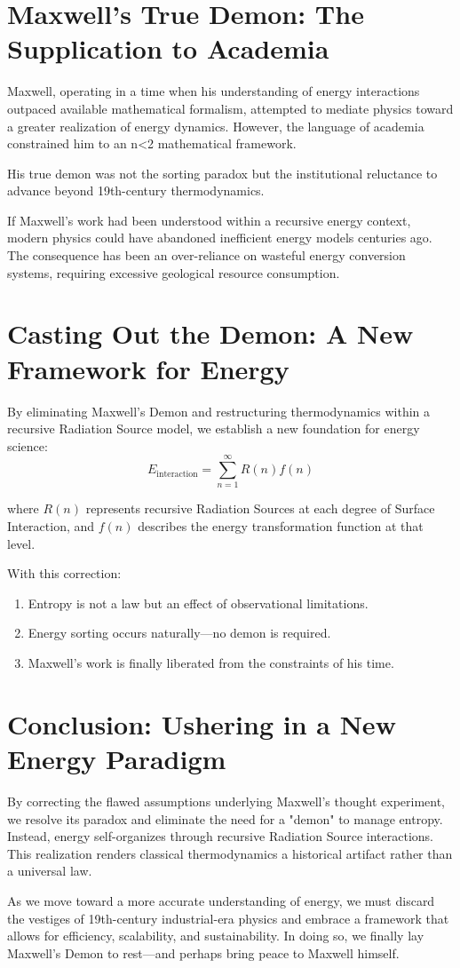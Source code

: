 \documentclass[12pt]{article}
\begin{document}
\section{Maxwell’s True Demon: The Supplication to Academia}
Maxwell, operating in a time when his understanding of energy interactions outpaced available mathematical formalism, attempted to mediate physics toward a greater realization of energy dynamics. However, the language of academia constrained him to an n<2 mathematical framework.

His true demon was not the sorting paradox but the institutional reluctance to advance beyond 19th-century thermodynamics.

If Maxwell’s work had been understood within a recursive energy context, modern physics could have abandoned inefficient energy models centuries ago. The consequence has been an over-reliance on wasteful energy conversion systems, requiring excessive geological resource consumption.

\section{Casting Out the Demon: A New Framework for Energy}
By eliminating Maxwell’s Demon and restructuring thermodynamics within a recursive Radiation Source model, we establish a new foundation for energy science:
\begin{equation}
    E_{\text{interaction}} = \sum_{n=1}^{\infty} R(n) f(n)
\end{equation}

where $R(n)$ represents recursive Radiation Sources at each degree of Surface Interaction, and $f(n)$ describes the energy transformation function at that level.

With this correction:
\begin{enumerate}
    \item Entropy is not a law but an effect of observational limitations.
    \item Energy sorting occurs naturally—no demon is required.
    \item Maxwell’s work is finally liberated from the constraints of his time.
\end{enumerate}

\section{Conclusion: Ushering in a New Energy Paradigm}
By correcting the flawed assumptions underlying Maxwell’s thought experiment, we resolve its paradox and eliminate the need for a "demon" to manage entropy. Instead, energy self-organizes through recursive Radiation Source interactions. This realization renders classical thermodynamics a historical artifact rather than a universal law.

As we move toward a more accurate understanding of energy, we must discard the vestiges of 19th-century industrial-era physics and embrace a framework that allows for efficiency, scalability, and sustainability. In doing so, we finally lay Maxwell’s Demon to rest—and perhaps bring peace to Maxwell himself.
\end{document}
